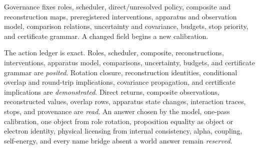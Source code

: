 Governance fixes roles, scheduler, direct/unresolved policy, composite and reconstruction maps, preregistered
interventions, apparatus and observation model, comparison relations, uncertainty and covariance, budgets, stop
priority, and certificate grammar.  A changed field begins a new calibration.

The action ledger is exact.  Roles, scheduler, composite, reconstructions, interventions, apparatus model,
comparisons, uncertainty, budgets, and certificate grammar are \emph{posited}.  Rotation closure, reconstruction
identities, conditional overlap and round-trip implications, covariance propagation, and certificate implications are
\emph{demonstrated}.  Direct returns, composite observations, reconstructed values, overlap rows, apparatus state
changes, interaction traces, stops, and provenance are \emph{read}.  An answer chosen by the model, one-pass
calibration, one object from role rotation, proposition equality as object or electron identity, physical licensing
from internal consistency, alpha, coupling, self-energy, and every name bridge absent a world answer remain
\emph{reserved}.
